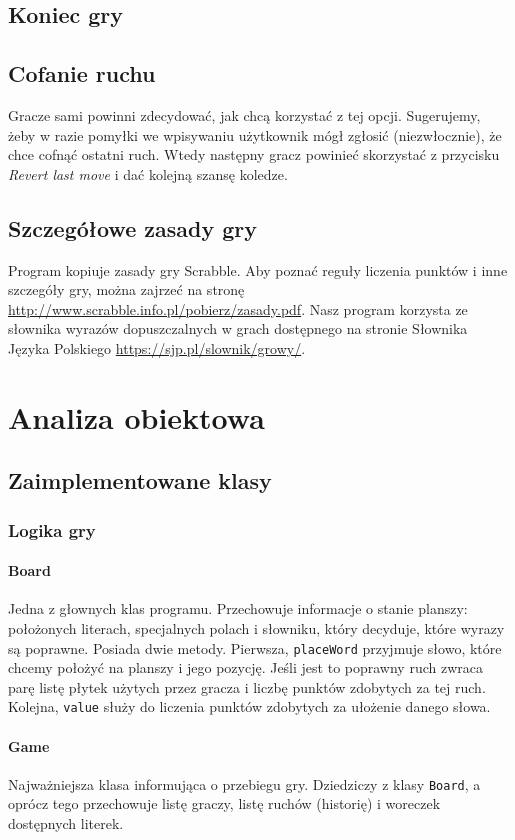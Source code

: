 \documentclass[a4paper]{article}
\begin{document}
\subsection{Koniec gry}
\subsection{Cofanie ruchu}
Gracze sami powinni zdecydować, jak chcą korzystać z tej opcji. Sugerujemy, żeby w razie pomyłki we wpisywaniu użytkownik mógł zgłosić (niezwłocznie), że chce cofnąć ostatni ruch. Wtedy następny gracz powinieć skorzystać z przycisku \textit{Revert last move} i dać kolejną szansę koledze.
\subsection{Szczegółowe zasady gry}
Program kopiuje zasady gry Scrabble. Aby poznać reguły liczenia punktów i inne szczegóły gry, można zajrzeć na stronę \url{http://www.scrabble.info.pl/pobierz/zasady.pdf}. Nasz program korzysta ze słownika wyrazów dopuszczalnych w grach dostępnego na stronie Słownika Języka Polskiego \url{https://sjp.pl/slownik/growy/}.
\section{Analiza obiektowa}
\subsection{Zaimplementowane klasy}
\subsubsection{Logika gry}
\paragraph{Board} Jedna z głownych klas programu. Przechowuje informacje o stanie planszy: położonych literach, specjalnych polach i słowniku, który decyduje, które wyrazy są poprawne. Posiada dwie metody. Pierwsza, \texttt{placeWord} przyjmuje słowo, które chcemy położyć na planszy i jego pozycję. Jeśli jest to poprawny ruch zwraca parę listę płytek użytych przez gracza i liczbę punktów zdobytych za tej ruch. Kolejna, \texttt{value} służy do liczenia punktów zdobytych za ułożenie danego słowa.
\paragraph{Game} Najważniejsza klasa informująca o przebiegu gry. Dziedziczy z klasy \texttt{Board}, a oprócz tego przechowuje listę graczy, listę ruchów (historię) i woreczek dostępnych literek.
\end{document}

